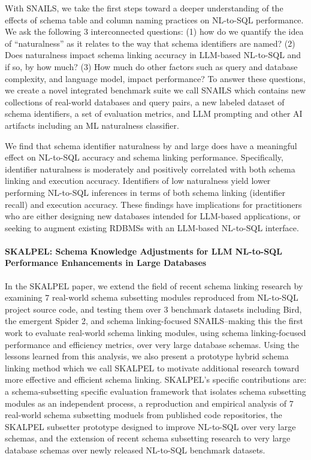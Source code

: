 With SNAILS, we take the first steps toward a deeper understanding of the effects of schema table and column naming practices on NL-to-SQL performance.
We ask the following 3 interconnected questions: (1) how do we quantify the idea of ``naturalness'' as it relates to the way that schema identifiers are named? (2) Does naturalness impact schema linking accuracy in LLM-based NL-to-SQL and if so, by how much? (3) How much do other factors such as query and database complexity, and language model, impact performance?
To answer these questions, we create a novel integrated benchmark suite we call SNAILS which contains new collections of real-world databases and query pairs, a new labeled dataset of schema identifiers, a set of evaluation metrics, and LLM prompting and other AI artifacts including an ML naturalness classifier.

We find that schema identifier naturalness by and large does have a meaningful effect on NL-to-SQL accuracy and schema linking performance.
Specifically, identifier naturalness is moderately and positively correlated with both schema linking and execution accuracy.
Identifiers of low naturalness yield lower performing NL-to-SQL inferences in terms of both schema linking (identifier recall) and execution accuracy.
These findings have implications for practitioners who are either designing new databases intended for LLM-based applications, or seeking to augment existing RDBMSs with an LLM-based NL-to-SQL interface.

\paragraph{\textbf{SKALPEL: Schema Knowledge Adjustments for LLM NL-to-SQL Performance Enhancements in Large Databases}}

In the SKALPEL paper, we extend the field of recent schema linking research by examining 7 real-world schema subsetting modules reproduced from NL-to-SQL project source code, and testing them over 3 benchmark datasets including Bird, the emergent Spider 2, and schema linking-focused SNAILS--making this the first work to evaluate real-world schema linking modules, using schema linking-focused performance and efficiency metrics, over very large database schemas.
Using the lessons learned from this analysis, we also present a prototype hybrid schema linking method which we call SKALPEL to motivate additional research toward more effective and efficient schema linking.
SKALPEL's specific contributions are: a schema-subsetting specific evaluation framework that isolates schema subsetting modules as an independent process, a reproduction and empirical analysis of 7 real-world schema subsetting moduels from published code repositories, the SKALPEL subsetter prototype designed to improve NL-to-SQL over very large schemas, and the extension of recent schema subsetting research to very large database schemas over newly released NL-to-SQL benchmark datasets.

